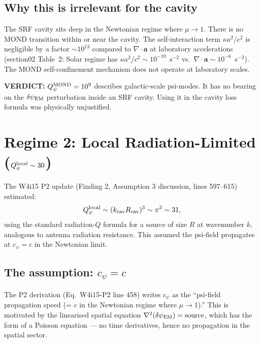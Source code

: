\documentclass[11pt]{article}
\newcommand{\Qpsi}{Q_\psi}
\newcommand{\dpsiEM}{\delta\psi_{\rm EM}}
\newcommand{\verdict}[1]{\textcolor{green!50!black}{\textbf{VERDICT:} #1}}
\theoremstyle{definition}
\theoremstyle{remark}
\begin{document}
\subsection{Why this is irrelevant for the cavity}

The SRF cavity sits deep in the Newtonian regime where $\mu \to 1$.
There is no MOND transition within or near the cavity. The
self-interaction term $\kappa a^2/c^2$ is negligible by a factor
$\sim 10^{13}$ compared to $\nabla \cdot \mathbf{a}$ at laboratory
accelerations (section02 Table~2: Solar regime has $\kappa a^2/c^2
\sim 10^{-19}$~s$^{-2}$ vs.\ $\nabla \cdot \mathbf{a} \sim
10^{-6}$~s$^{-2}$). The MOND self-confinement mechanism does not
operate at laboratory scales.

\verdict{$\Qpsi^{\rm MOND} = 10^9$ describes galactic-scale psi-modes.
It has no bearing on the $\dpsiEM$ perturbation inside an SRF cavity.
Using it in the cavity loss formula was physically unjustified.}


\section{Regime 2: Local Radiation-Limited ($\Qpsi^{\rm local} \sim 30$)}
\label{sec:regime2}

The W4i15 P2 update (Finding 2, Assumption 3 discussion, lines 597--615)
estimated:
\begin{equation}
\Qpsi^{\rm local} \sim (k_{\rm cav} R_{\rm cav})^3 \sim \pi^3 \sim 31,
\end{equation}
using the standard radiation-$Q$ formula for a source of size $R$ at
wavenumber $k$, analogous to antenna radiation resistance. This assumed
the psi-field propagates at $c_\psi = c$ in the Newtonian limit.

\subsection{The assumption: $c_\psi = c$}

The P2 derivation (Eq.~W4i15-P2 line 458) writes $c_\psi$ as the
``psi-field propagation speed (= $c$ in the Newtonian regime where
$\mu \to 1$).'' This is motivated by the linearised spatial equation
$\nabla^2(\dpsiEM) = \text{source}$, which has the form of a Poisson
equation --- no time derivatives, hence no propagation in the spatial
sector.
\end{document}
